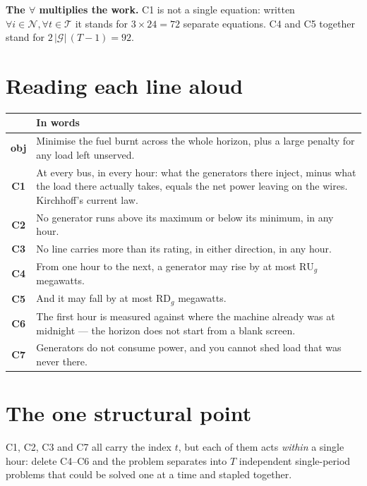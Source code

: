 \documentclass[11pt]{article}
\newcommand{\new}[1]{\textcolor{accent}{#1}}
\begin{document}
\noindent\textbf{The $\forall$ multiplies the work.} C1 is not a single equation: written
$\forall i \in \mathcal{N}, \forall t \in \mathcal{T}$ it stands for $3 \times 24 = 72$ separate
equations. C4 and C5 together stand for $2\,|\mathcal{G}|\,(T-1) = 92$.

\section{Reading each line aloud}

\begin{center}
\begin{tabular}{@{}c L{12.6cm}@{}}
\toprule
& \textbf{In words} \\
\midrule
\textbf{obj} & Minimise the fuel burnt across the whole horizon, plus a large penalty for any
  load left unserved. \\
\textbf{C1} & At every bus, in every hour: what the generators there inject, minus what the
  load there actually takes, equals the net power leaving on the wires. Kirchhoff's current law. \\
\textbf{C2} & No generator runs above its maximum or below its minimum, in any hour. \\
\textbf{C3} & No line carries more than its rating, in either direction, in any hour. \\
\new{\textbf{C4}} & \new{From one hour to the next, a generator may rise by at most
  $\mathrm{RU}_g$ megawatts.} \\
\new{\textbf{C5}} & \new{And it may fall by at most $\mathrm{RD}_g$ megawatts.} \\
\new{\textbf{C6}} & \new{The first hour is measured against where the machine already was at
  midnight --- the horizon does not start from a blank screen.} \\
\textbf{C7} & Generators do not consume power, and you cannot shed load that was never there. \\
\bottomrule
\end{tabular}
\end{center}

\section{The one structural point}

C1, C2, C3 and C7 all carry the index $t$, but each of them acts \emph{within} a single hour:
delete C4--C6 and the problem separates into $T$ independent single-period problems that could
be solved one at a time and stapled together.
\end{document}
